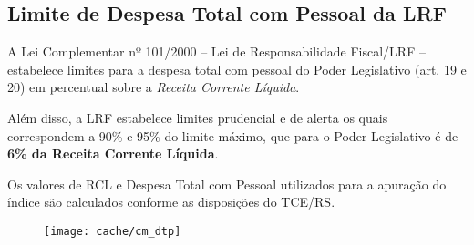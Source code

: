 
\subsection[Despesa Total com Pessoal]{Limite de Despesa Total com Pessoal da LRF}

A Lei Complementar nº 101/2000 – Lei de Responsabilidade Fiscal/LRF – estabelece limites para a despesa total com pessoal do Poder Legislativo (art. 19 e 20) em percentual sobre a \textit{Receita Corrente Líquida}.

Além disso, a LRF estabelece limites prudencial e de alerta os quais correspondem a 90\% e 95\% do limite máximo, que para o Poder Legislativo é de \textbf{6\% da Receita Corrente Líquida}.



Os valores de RCL e Despesa Total com Pessoal utilizados para a apuração do índice são calculados conforme as disposições do TCE/RS.

\begin{figure}
\center
\texttt{[image: cache/cm\_dtp]}
\end{figure}

